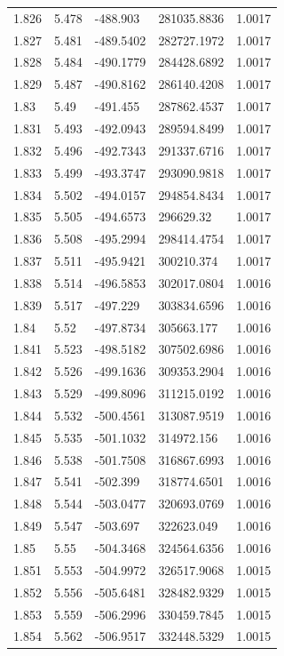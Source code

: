 \begin{tabular}{lllll}
1.826 & 5.478 & -488.903 & 281035.8836 & 1.0017 \\
1.827 & 5.481 & -489.5402 & 282727.1972 & 1.0017 \\
1.828 & 5.484 & -490.1779 & 284428.6892 & 1.0017 \\
1.829 & 5.487 & -490.8162 & 286140.4208 & 1.0017 \\
1.83 & 5.49 & -491.455 & 287862.4537 & 1.0017 \\
1.831 & 5.493 & -492.0943 & 289594.8499 & 1.0017 \\
1.832 & 5.496 & -492.7343 & 291337.6716 & 1.0017 \\
1.833 & 5.499 & -493.3747 & 293090.9818 & 1.0017 \\
1.834 & 5.502 & -494.0157 & 294854.8434 & 1.0017 \\
1.835 & 5.505 & -494.6573 & 296629.32 & 1.0017 \\
1.836 & 5.508 & -495.2994 & 298414.4754 & 1.0017 \\
1.837 & 5.511 & -495.9421 & 300210.374 & 1.0017 \\
1.838 & 5.514 & -496.5853 & 302017.0804 & 1.0016 \\
1.839 & 5.517 & -497.229 & 303834.6596 & 1.0016 \\
1.84 & 5.52 & -497.8734 & 305663.177 & 1.0016 \\
1.841 & 5.523 & -498.5182 & 307502.6986 & 1.0016 \\
1.842 & 5.526 & -499.1636 & 309353.2904 & 1.0016 \\
1.843 & 5.529 & -499.8096 & 311215.0192 & 1.0016 \\
1.844 & 5.532 & -500.4561 & 313087.9519 & 1.0016 \\
1.845 & 5.535 & -501.1032 & 314972.156 & 1.0016 \\
1.846 & 5.538 & -501.7508 & 316867.6993 & 1.0016 \\
1.847 & 5.541 & -502.399 & 318774.6501 & 1.0016 \\
1.848 & 5.544 & -503.0477 & 320693.0769 & 1.0016 \\
1.849 & 5.547 & -503.697 & 322623.049 & 1.0016 \\
1.85 & 5.55 & -504.3468 & 324564.6356 & 1.0016 \\
1.851 & 5.553 & -504.9972 & 326517.9068 & 1.0015 \\
1.852 & 5.556 & -505.6481 & 328482.9329 & 1.0015 \\
1.853 & 5.559 & -506.2996 & 330459.7845 & 1.0015 \\
1.854 & 5.562 & -506.9517 & 332448.5329 & 1.0015 \\

\end{tabular}
